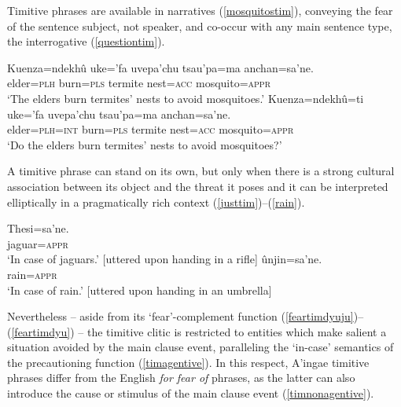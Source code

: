 \documentclass[output=paper,colorlinks,citecolor=brown]{langscibook}
\begin{document}
Timitive phrases are available in narratives (\ref{mosquitostim}), conveying the fear of the sentence subject, not speaker, and co-occur with any main sentence type, \eg the interrogative (\ref{questiontim}).

  \begin{exe} \ex \label{mosquitostim}
    
    \gll Kuenza=ndekhû uke='fa     uvepa'chu tsau'pa=ma {\ob}anchan=sa'ne.{\cb} \\
         elder=\textsc{plh}    burn=\textsc{pls} termite    nest=\textsc{acc} mosquito=\textsc{appr} \\
    \glt `The elders burn termites' nests to avoid mosquitoes.'
    \ex \label{questiontim}
    \gll Kuenza=ndekhû=ti uke='fa     uvepa'chu tsau'pa=ma {\ob}anchan=sa'ne.{\cb} \\
         elder=\textsc{plh=int}    burn=\textsc{pls} termite    nest=\textsc{acc} mosquito=\textsc{appr} \\
    \glt `Do the elders burn termites' nests to avoid mosquitoes?'
\end{exe}

    
A timitive phrase can stand on its own, but only when there is a strong cultural association between its object and the threat it poses and it can be interpreted elliptically in a pragmatically rich context (\ref{justtim})--(\ref{rain}).

    \begin{exe} \ex \label{justtim}
    \gll {\ob}Thesi=sa'ne.{\cb} \\
         jaguar=\textsc{appr} \\
    \glt `In case of jaguars.' [uttered upon handing in a rifle]
    \ex \label{rain}
    \gll {\ob}ûnjin=sa'ne.{\cb} \\
         rain=\textsc{appr} \\
    \glt `In case of rain.' [uttered upon handing in an umbrella]
\end{exe}    

Nevertheless -- aside from its `fear'-complement function (\ref{feartimdyuju})--(\ref{feartimdyu}) -- the timitive clitic  is restricted to {entities which make salient a situation avoided by the main clause event, paralleling the `in-case' semantics of the precautioning function (\ref{timagentive}). In this respect, A'ingae  timitive phrases differ from the English \textit{for fear of} phrases, as the latter can also introduce the cause or stimulus of the main clause event (\ref{timnonagentive}).}
\end{document}
